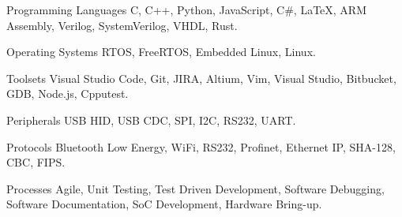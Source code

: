 


\begin{cvskills}


\cvskill
{Programming Languages} %
{C, C++, Python, JavaScript, C\#, LaTeX, ARM Assembly, Verilog, SystemVerilog, VHDL, Rust.} %


\cvskill
{Operating Systems} %
{RTOS, FreeRTOS, Embedded Linux, Linux.} %


\cvskill
{Toolsets} %
{Visual Studio Code, Git, JIRA, Altium, Vim, Visual Studio, Bitbucket, GDB, Node.js, Cpputest.} %


\cvskill
{Peripherals} %
{USB HID, USB CDC, SPI, I2C, RS232, UART.} %


\cvskill
{Protocols} %
{Bluetooth Low Energy, WiFi, RS232, Profinet, Ethernet IP, SHA-128, CBC, FIPS.} %


\cvskill
{Processes} %
{Agile, Unit Testing, Test Driven Development, Software Debugging, Software Documentation, \newline SoC Development, Hardware Bring-up.} %


\end{cvskills}